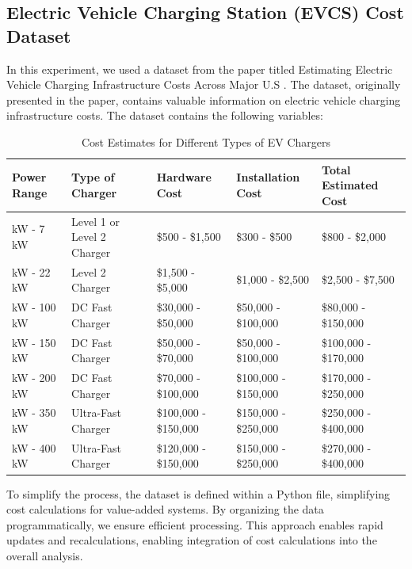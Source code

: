 \subsection{Electric Vehicle Charging Station (EVCS) Cost Dataset}
In this experiment, we used a dataset from the paper titled Estimating Electric Vehicle Charging Infrastructure Costs Across Major U.S \cite{EVC infrastructure costs}. The dataset, originally presented in the paper, contains valuable information on electric vehicle charging infrastructure costs. The dataset contains the following variables:

\begin{table}[h!]
    \centering
    \small %
    \begin{tabular}{|>{\raggedright\arraybackslash}p{2cm}|>{\raggedright\arraybackslash}p{3cm}|>{\raggedright\arraybackslash}p{2cm}|>{\raggedright\arraybackslash}p{2cm}|>{\raggedright\arraybackslash}p{3cm}|}
    \hline
    \textbf{Power Range} & \textbf{Type of Charger} & \textbf{Hardware Cost} & \textbf{Installation Cost} & \textbf{Total Estimated Cost} \\
    \hline
    3 kW - 7 kW & Level 1 or Level 2 Charger & \$500 - \$1,500 & \$300 - \$500 & \$800 - \$2,000 \\
    \hline
    7 kW - 22 kW & Level 2 Charger & \$1,500 - \$5,000 & \$1,000 - \$2,500 & \$2,500 - \$7,500 \\
    \hline
    50 kW - 100 kW & DC Fast Charger & \$30,000 - \$50,000 & \$50,000 - \$100,000 & \$80,000 - \$150,000 \\
    \hline
    100 kW - 150 kW & DC Fast Charger & \$50,000 - \$70,000 & \$50,000 - \$100,000 & \$100,000 - \$170,000 \\
    \hline
    150 kW - 200 kW & DC Fast Charger & \$70,000 - \$100,000 & \$100,000 - \$150,000 & \$170,000 - \$250,000 \\
    \hline
    200 kW - 350 kW & Ultra-Fast Charger & \$100,000 - \$150,000 & \$150,000 - \$250,000 & \$250,000 - \$400,000 \\
    \hline
    350 kW - 400 kW & Ultra-Fast Charger & \$120,000 - \$150,000 & \$150,000 - \$250,000 & \$270,000 - \$400,000 \\
    \hline
    \end{tabular}
    \caption{Cost Estimates for Different Types of EV Chargers}
\end{table}

To simplify the process, the dataset is defined within a Python file, simplifying cost calculations for value-added systems. By organizing the data programmatically, we ensure efficient processing. This approach enables rapid updates and recalculations, enabling integration of cost calculations into the overall analysis.




